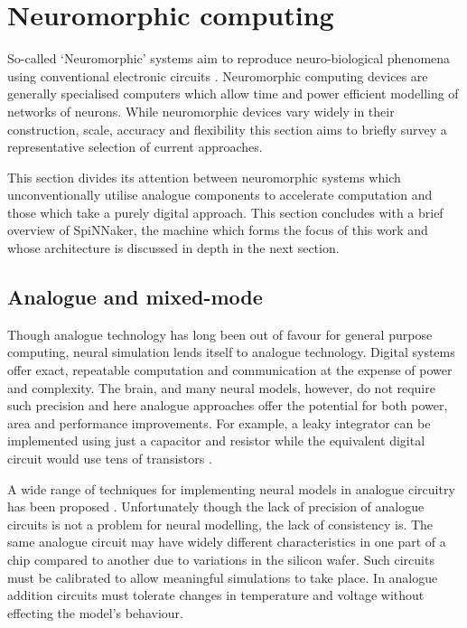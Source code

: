 	
	
	\section{Neuromorphic computing}
		
		So-called `Neuromorphic' systems aim to reproduce neuro-biological phenomena
		using conventional electronic circuits \cite{mead90}. Neuromorphic computing
		devices are generally specialised computers which allow time and power
		efficient modelling of networks of neurons. While neuromorphic devices vary
		widely in their construction, scale, accuracy and flexibility this section
		aims to briefly survey a representative selection of current approaches.
		
		This section divides its attention between neuromorphic systems which
		unconventionally utilise analogue components to accelerate computation and
		those which take a purely digital approach. This section concludes with a
		brief overview of SpiNNaker, the machine which forms the focus of this work
		and whose architecture is discussed in depth in the next section.
		
		\subsection{Analogue and mixed-mode}
			
			
			Though analogue technology has long been out of favour for general purpose
			computing, neural simulation lends itself to analogue technology.  Digital
			systems offer exact, repeatable computation and communication at the
			expense of power and complexity. The brain, and many neural models,
			however, do not require such precision and here analogue approaches offer
			the potential for both power, area and performance improvements. For
			example, a leaky integrator can be implemented using just a capacitor and
			resistor while the equivalent digital circuit would use tens of
			transistors \cite{misra10}.
			
			A wide range of techniques for implementing neural models in analogue
			circuitry has been proposed \cite{graf86,holler89,agranat90,azghadi13}.
			Unfortunately though the lack of precision of analogue circuits is not a
			problem for neural modelling, the lack of consistency is. The same
			analogue circuit may have widely different characteristics in one part of
			a chip compared to another due to variations in the silicon wafer. Such
			circuits must be calibrated to allow meaningful simulations to take place.
			In analogue addition circuits must tolerate changes in temperature and
			voltage without effecting the model's behaviour.
			
